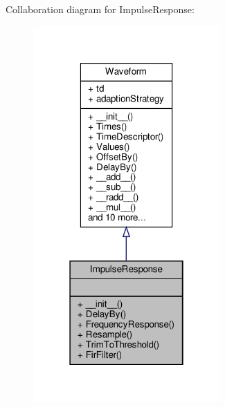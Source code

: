 Collaboration diagram for Impulse\+Response\+:
\nopagebreak
\begin{figure}[H]
\begin{center}
\leavevmode
\includegraphics[width=202pt]{classSignalIntegrity_1_1TimeDomain_1_1Waveform_1_1ImpulseResponse_1_1ImpulseResponse__coll__graph}
\end{center}
\end{figure}
